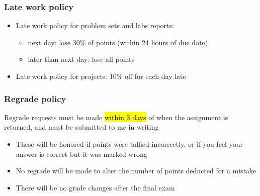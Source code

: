 \documentclass[11pt,containsverbatim,handout,xcolor=xelatex,dvipsnames,table]{beamer}
\begin{document}

\begin{frame}
\frametitle{Late work policy}

\begin{itemize}

\item Late work policy for problem sets and labs reports:
\begin{itemize}
\item next day: lose 30\% of points (within 24 hours of due date)
\item later than next day: lose all points
\end{itemize}

\item Late work policy for projects: 10\% off for each day late

\end{itemize}

\end{frame}


\begin{frame}
\frametitle{Regrade policy}

Regrade requests must be made \hl{within 3 days} of when the assignment is returned, and must be submitted to me in writing 

\begin{itemize}

\item These will be honored if points were tallied incorrectly, or if you feel your answer is correct but it was marked wrong

\item No regrade will be made to alter the number of points deducted for a mistake

\item There will be no grade changes after the final exam

\end{itemize}

\end{frame}

\end{document}
